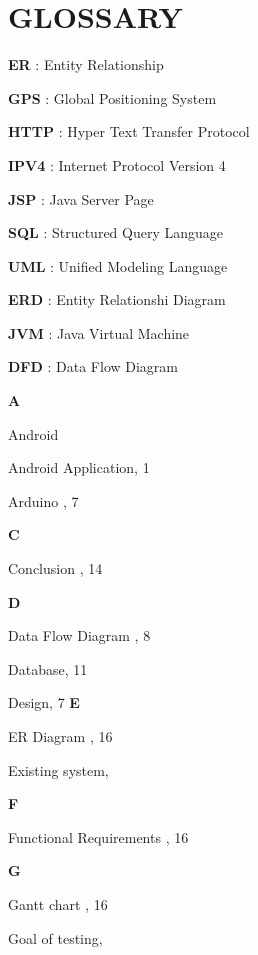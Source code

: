 \documentclass[12pt,a4paper,oneside]{report}
\begin{document}
{\chapter*{GLOSSARY}
\textbf{ER}  : Entity Relationship
\par \textbf{GPS} : Global Positioning System
 \par \textbf{HTTP} : Hyper Text Transfer Protocol
\par \textbf{IPV4} : Internet Protocol Version 4
\par  \textbf{JSP} : Java Server Page
\par \textbf{SQL} : Structured Query Language
\par \textbf{UML} : Unified Modeling Language
\par \textbf{ERD} : Entity Relationshi Diagram
\par \textbf{JVM} : Java Virtual Machine
\par \textbf{DFD} : Data Flow Diagram

\begin{theindex}

\rhead{\empty}
\lhead{\empty}
\lfoot{\empty}
\vspace{.2in}
\large\textbf{A}
\item  Android 
\item  Android Application, 1
\item Arduino , 7

\vspace{.2in}
\large\textbf{C}
\item Conclusion , 14

\vspace{.2in}
\large\textbf{D}
\item Data Flow Diagram , 8
\item Database, 11
\item Design, 7
\vspace{.2in}
\large\textbf{E}
\item ER Diagram , 16
\item Existing system, 
\vspace{.2in}

\large\textbf{F}
\item Functional Requirements , 16
\vspace{.2in}

\large\textbf{G}
\item Gantt chart , 16
\item Goal of testing, 
\vspace{.2in}


\end{theindex}}
\end{document}
